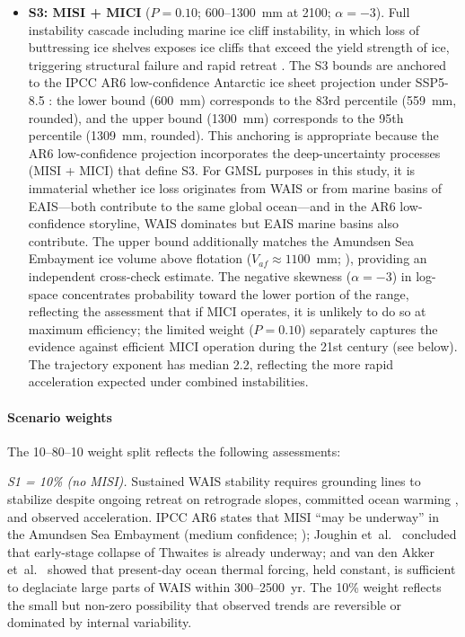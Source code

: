 \documentclass[12pt]{article}
\newcommand{\subsubsubsection}[1]{\paragraph{#1}\mbox{}\par}
\begin{document}
\begin{itemize}
\item \textbf{S3: MISI + MICI} ($P = 0.10$; 600--1300~mm at 2100; $\alpha = -3$). Full instability cascade including marine ice cliff instability, in which loss of buttressing ice shelves exposes ice cliffs that exceed the yield strength of ice, triggering structural failure and rapid retreat \citep{Bassis2012, DeContoP2016}. The S3 bounds are anchored to the IPCC AR6 low-confidence Antarctic ice sheet projection under SSP5-8.5 \citep{Fox-Kemper2021}: the lower bound (600~mm) corresponds to the 83rd percentile (559~mm, rounded), and the upper bound (1300~mm) corresponds to the 95th percentile (1309~mm, rounded). This anchoring is appropriate because the AR6 low-confidence projection incorporates the deep-uncertainty processes (MISI + MICI) that define S3. For GMSL purposes in this study, it is immaterial whether ice loss originates from WAIS or from marine basins of EAIS---both contribute to the same global ocean---and in the AR6 low-confidence storyline, WAIS dominates but EAIS marine basins also contribute. The upper bound additionally matches the Amundsen Sea Embayment ice volume above flotation ($V_{af} \approx 1100$~mm; \cite{Morlighem2020}), providing an independent cross-check estimate. The negative skewness ($\alpha = -3$) in log-space concentrates probability toward the lower portion of the range, reflecting the assessment that if MICI operates, it is unlikely to do so at maximum efficiency; the limited weight ($P = 0.10$) separately captures the evidence against efficient MICI operation during the 21st century (see below). The trajectory exponent has median 2.2, reflecting the more rapid acceleration expected under combined instabilities.
\end{itemize}

\subsubsubsection{Scenario weights}

The 10--80--10 weight split reflects the following assessments:

\textit{S1 = 10\% (no MISI).} Sustained WAIS stability requires grounding lines to stabilize despite ongoing retreat on retrograde slopes, committed ocean warming \citep{Naughten2023}, and observed acceleration. IPCC AR6 states that MISI ``may be underway'' in the Amundsen Sea Embayment (medium confidence; \cite{Fox-Kemper2021}); Joughin et~al.~\citep{Joughin2014} concluded that early-stage collapse of Thwaites is already underway; and van den Akker et~al.~\citep{vandenAkker2025} showed that present-day ocean thermal forcing, held constant, is sufficient to deglaciate large parts of WAIS within 300--2500~yr. The 10\% weight reflects the small but non-zero possibility that observed trends are reversible or dominated by internal variability.
\end{document}
